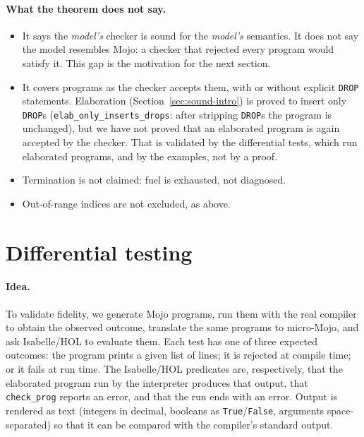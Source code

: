 \documentclass[11pt,a4paper]{article}
\newcommand{\micro}{micro-Mojo}
\newcommand{\IHOL}{Isabelle/HOL}
\newcommand{\code}[1]{\texttt{#1}}
\begin{document}
\paragraph{What the theorem does not say.}
\begin{itemize}
\item It says the \emph{model's} checker is sound for the \emph{model's}
  semantics. It does not say the model resembles Mojo: a checker that rejected
  every program would satisfy it. This gap is the motivation for the next
  section.
\item It covers programs as the checker accepts them, with or without explicit
  \code{DROP} statements. Elaboration (Section~\ref{sec:sound-intro}) is proved
  to insert only \code{DROP}s (\code{elab\_only\_inserts\_drops}: after stripping
  \code{DROP}s the program is unchanged), but we have not proved that an
  elaborated program is again accepted by the checker. That is validated by the
  differential tests, which run elaborated programs, and by the examples, not
  by a proof.
\item Termination is not claimed: fuel is exhausted, not diagnosed.
\item Out-of-range indices are not excluded, as above.
\end{itemize}

\section{Differential testing}\label{sec:dt}

\paragraph{Idea.}
To validate fidelity, we generate Mojo programs, run them with the real compiler
to obtain the observed outcome, translate the same programs to \micro{}, and ask
\IHOL{} to evaluate them. Each test has one of three expected outcomes: the program
prints a given list of lines; it is rejected at compile time; or it fails at run
time. The \IHOL{} predicates are, respectively, that the elaborated program run by
the interpreter produces that output, that \code{check\_prog} reports an error,
and that the run ends with an error. Output is rendered as text (integers in
decimal, booleans as \code{True}/\code{False}, arguments space-separated) so
that it can be compared with the compiler's standard output.
\end{document}
